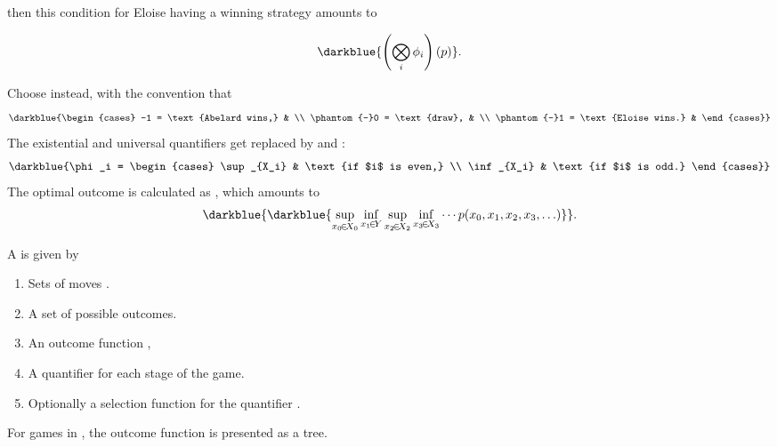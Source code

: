 \documentclass%
[%
Screen4to3,
]{foils}
\begin{document}
then this condition for Eloise
having a winning strategy amounts to

\[ \darkblue{\left(\bigotimes_{i} \phi_i\right)(p)}. \] 


    
Choose 
instead, with the convention that 
\[
\darkblue{\begin{cases}
 -1 = \text{Abelard wins,} & \\
 \phantom{-}0 = \text{draw}, & \\
 \phantom{-}1 = \text{Eloise wins.} & 
\end{cases}}
\]
The existential and universal quantifiers get
replaced by \darkblue{$\sup$} and \darkblue{$\inf$}:
\[
  \darkblue{\phi_i =  
  \begin{cases}
    \sup_{X_i} & \text{if $i$ is even,} \\
    \inf_{X_i} & \text{if $i$ is odd.} 
  \end{cases}}
\]
The optimal outcome is calculated as , which %
amounts to
\[\darkblue{\darkblue{\sup_{x_0 \!\in\! X_0} \inf_{x_1 \!\in\! Y}\sup_{x_{2} \!\in\! X_{2}} \inf_{x_{3} \!\in\! X_{3}} \cdots p(x_0, x_1, x_2, x_3, \ldots)}}.
\]



A  is given by
\begin{enumerate}
\item[\grey{1.}] Sets of moves .
\item[\grey{2.}] A set  of possible outcomes.
\item[\grey{3.}] An outcome function ,
\item[\grey{4.}] A quantifier  for each stage of the game.
\item[\grey{5.}] Optionally a selection function
   for the quantifier .
\end{enumerate}

\vfill


For games in , the outcome function is
presented as a tree.
\end{document}
